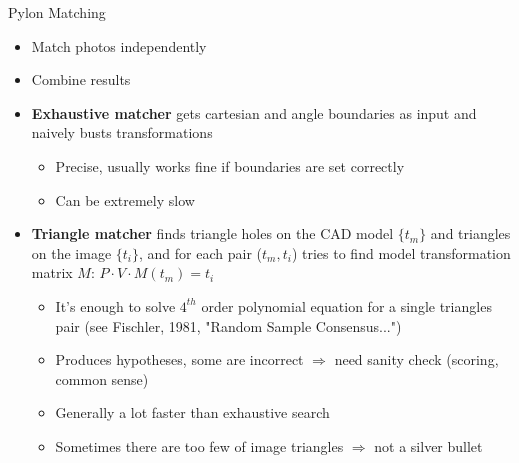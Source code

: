 \documentclass{beamer}
\begin{document}
\begin{frame}[t, fragile]{Pylon Matching}
\begin{itemize} 
\item Match photos independently
\item Combine results
\end{itemize}

\begin{itemize} 
\item \textbf{Exhaustive matcher} gets cartesian and angle boundaries as input and naively busts transformations   
\begin{itemize} 
\item Precise, usually works fine if boundaries are set correctly
\item Can be extremely slow
\end{itemize} 
\item \textbf{Triangle matcher} finds triangle holes on the CAD model $\{t_m\}$ and triangles on the image $\{t_i\}$, and for each pair ($t_m, t_i$) tries to find model transformation matrix $M$: $P \cdot V \cdot M(t_m) = t_i$   
\begin{itemize}
\item It's enough to solve $4^{th}$ order polynomial equation for a single triangles pair
(see Fischler, 1981, "Random Sample Consensus...")
\item Produces hypotheses, some are incorrect $\Rightarrow$ need sanity check (scoring, common sense)
\item Generally a lot faster than exhaustive search
\item Sometimes there are too few of image triangles $\Rightarrow$ not a silver bullet
 
\end{itemize}
\end{itemize}

\end{frame}
\end{document}
